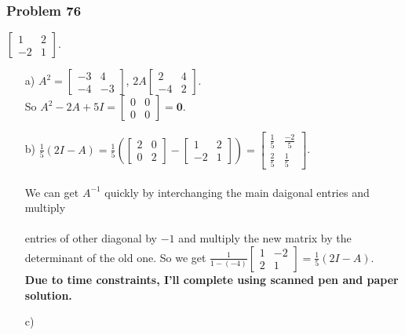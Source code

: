 \documentclass[a4paper,12pt]{article}
\begin{document}
\subsubsection*{Problem 76}
$\begin{bmatrix}
      1 & 2 \\
      -2 & 1
    \end{bmatrix}.$
\begin{itemize}
    \item [a)] $A^2=\begin{bmatrix}
      -3 & 4 \\
      -4 & -3
    \end{bmatrix}$, $2A \begin{bmatrix}
      2 & 4 \\
      -4 & 2
    \end{bmatrix}.$\\
    So $A^2-2A+5I= \begin{bmatrix}
      0 & 0 \\
      0 & 0
    \end{bmatrix} = \textbf{0}.$
    \item [b)] $\frac{1}{5}(2I-A)=\frac{1}{5}(\begin{bmatrix}
      2 & 0 \\
      0 & 2
    \end{bmatrix}-\begin{bmatrix}
      1 & 2 \\
      -2 & 1
    \end{bmatrix}) = \begin{bmatrix}
      \frac{1}{5} & \frac{-2}{5} \\
      \frac{2}{5} & \frac{1}{5}
    \end{bmatrix}$. \\
   \\ We can get $A^{-1}$ quickly by interchanging the main daigonal entries and multiply \\ \\ entries of other diagonal by $-1$ and multiply the new matrix by the determinant of the old one. So we get $\frac{1}{1-(-4)}\begin{bmatrix}
      1 & -2 \\
      2 & 1
    \end{bmatrix} = \frac{1}{5}(2I-A).$ \\

    \textbf{Due to time constraints, I'll complete using scanned pen and paper solution.}
    \item [c)]
\end{itemize}
\end{document}
